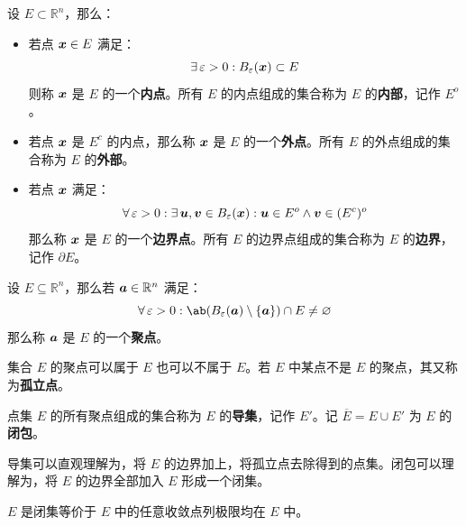 \begin{definition}[内点、外点、边界点]
    设 $E \subset \mathbb{R}^{n}$，那么：
    \begin{itemize}
        \item 若点 $\boldsymbol{x} \in E$ 满足：
        $$
        \exists\,\varepsilon > 0: B_{\varepsilon}(\boldsymbol{x}) \subset E
        $$
        则称 $\boldsymbol{x}$ 是 $E$ 的一个\textbf{内点}。所有 $E$ 的内点组成的集合称为 $E$ 的\textbf{内部}，记作 $E^o$。
        
        \item 若点 $\boldsymbol{x}$ 是 $E^c$ 的内点，那么称 $\boldsymbol{x}$ 是 $E$ 的一个\textbf{外点}。所有 $E$ 的外点组成的集合称为 $E$ 的\textbf{外部}。
        
        \item 若点 $\boldsymbol{x}$ 满足：
        $$
        \forall\,\varepsilon > 0: \exists\,\boldsymbol{u}, \boldsymbol{v} \in B_{\varepsilon}(\boldsymbol{x}): \boldsymbol{u} \in E^o \land \boldsymbol{v} \in (E^c)^o
        $$
        那么称 $\boldsymbol{x}$ 是 $E$ 的一个\textbf{边界点}。所有 $E$ 的边界点组成的集合称为 $E$ 的\textbf{边界}，记作 $\partial E$。
    \end{itemize}
\end{definition}

\begin{definition}[聚点]
    设 $E \subseteq \mathbb{R}^{n}$，那么若 $\boldsymbol{a} \in \mathbb{R}^{n}$ 满足：
    $$
    \forall\, \varepsilon > 0: \ab(B_{\varepsilon}(\vect{a}) \setminus \{\vect{a}\}) \cap E \neq \varnothing
    $$
    那么称 $\boldsymbol{a}$ 是 $E$ 的一个\textbf{聚点}。
\end{definition}

\begin{remark}
    集合 $E$ 的聚点可以属于 $E$ 也可以不属于 $E$。若 $E$ 中某点不是 $E$ 的聚点，其又称为\textbf{孤立点}。
\end{remark}

\begin{definition}[导集]
    点集 $E$ 的所有聚点组成的集合称为 $E$ 的\textbf{导集}，记作 $E'$。记 $\overline{E} = E \cup E'$ 为 $E$ 的\textbf{闭包}。
\end{definition}

导集可以直观理解为，将 $E$ 的边界加上，将孤立点去除得到的点集。闭包可以理解为，将 $E$ 的边界全部加入 $E$ 形成一个闭集。

\begin{theorem}
    $E$ 是闭集等价于 $E$ 中的任意收敛点列极限均在 $E$ 中。
\end{theorem}

